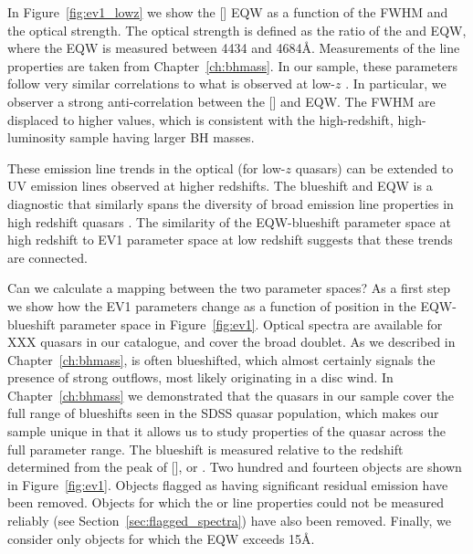 In Figure~\ref{fig:ev1_lowz} we show the [] EQW as a function of the \hb FWHM and the optical  strength. 
The optical  strength is defined as the ratio of the  and \hb EQW, where the  EQW is measured between 4434 and 4684\AA.
Measurements of the \hb line properties are taken from Chapter~\ref{ch:bhmass}. 
In our sample, these parameters follow very similar correlations to what is observed at low-$z$ \citep[see also][]{sulentic04, shen16a}.
In particular, we observer a strong anti-correlation between the [] and  EQW.  
The \hb FWHM are displaced to higher values, which is consistent with the high-redshift, high-luminosity sample having larger BH masses. 

These emission line trends in the optical (for low-$z$ quasars) can be extended to UV emission lines observed at higher redshifts. 
The  blueshift and EQW is a diagnostic that similarly spans the diversity of broad emission line properties in high redshift quasars \citep[dominated by a virialized component at one extreme and a wind driven component at the other][]{richards11,sulentic07}. 
The similarity of the  EQW-blueshift parameter space at high redshift to EV1 parameter space at low redshift suggests that these trends are connected. 

Can we calculate a mapping between the two parameter spaces? 
As a first step we show how the EV1 parameters change as a function of position in the  EQW-blueshift parameter space in Figure~\ref{fig:ev1}.
Optical spectra are available for XXX quasars in our catalogue, and cover the broad  doublet. 
As we described in Chapter~\ref{ch:bhmass},  is often blueshifted, which almost certainly signals the presence of strong outflows, most likely originating in a disc wind.
In Chapter~\ref{ch:bhmass} we demonstrated that the quasars in our sample cover the full range of  blueshifts seen in the SDSS quasar population, which makes our sample unique in that it allows us to study properties of the quasar across the full parameter range. 
The  blueshift is measured relative to the redshift determined from the peak of [], \hb or \hans. 
Two hundred and fourteen objects are shown in Figure~\ref{fig:ev1}.
Objects flagged as having significant  residual emission have been removed.  
Objects for which the \hb or  line properties could not be measured reliably (see Section~\ref{sec:flagged_spectra}) have also been removed. 
Finally, we consider only objects for which the  EQW exceeds 15\AA. 

